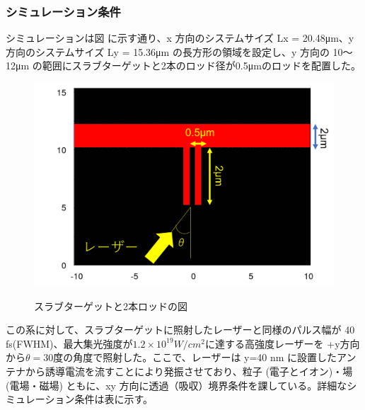 \documentclass[a4paper,11pt,titlepage]{jarticle}
\numberwithin{equation}{section} %
\begin{document}
\subsubsection{シミュレーション条件}
シミュレーションは図 に示す通り、x 方向のシステムサイズ Lx = 20.48μm、y 方向のシステムサイズ Ly = 15.36μm の長方形の領域を設定し、y 方向の 10～12μm の範囲にスラブターゲットと2本のロッド径が0.5μmのロッドを配置した。

\begin{figure}[H]
  \begin{center}
    \includegraphics[scale=0.4]{./image/4-6-2rod.png}
    \label{fig:4-5}
    \caption{スラブターゲットと2本ロッドの図}
  \end{center}
\end{figure}

この系に対して、スラブターゲットに照射したレーザーと同様のパルス幅が 40 fs(FWHM)、最大集光強度が$1.2×10^{19}W/cm^2$に達する高強度レーザーを +y方向から$\theta=$30度の角度で照射した。ここで、レーザーは y=40 nm に設置したアンテナから誘導電流を流すことにより発振させており、粒子 (電子とイオン)・場 (電場・磁場) ともに、xy 方向に透過（吸収）境界条件を課している。詳細なシミュレーション条件は表に示す。
\end{document}
